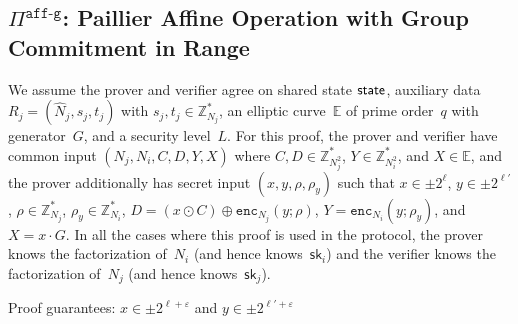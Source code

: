 \documentclass[11pt]{article}
\def\state{{\sf state}}
\newcommand{\enc}{\ensuremath{\mathtt{enc}}}
\newcommand{\proof}[1]{\ensuremath{\Pi^{\mathtt{#1}}}}
\newcommand{\sk}{\textsf{sk}}
\newcommand{\E}{\mathbb{E}}
\newcommand{\Z}{\mathbb{Z}}
\newcommand{\?}[1]{\stackrel{?}{#1}}
\begin{document}
\begin{description}
\end{description}

\subsection{\proof{aff\mbox{-}g}: Paillier Affine Operation with Group Commitment in Range}


We assume the prover and verifier agree on shared state $\state$, auxiliary data $R_j = (\hat N_j, s_j, t_j)$ with $s_j, t_j \in \Z^*_{N_j}$,
an elliptic curve~$\E$ of prime order~$q$ with generator~$G$,
and a security level~$L$.
For this proof, the prover and verifier have common input 
$(N_j, N_i, C, D, Y, X)$ 
where $C, D \in \Z^*_{N_j^2}$, 
$Y \in \Z^*_{N_i^2}$, and
$X \in \E$, and the prover additionally has secret input 
$(x, y, \rho, \rho_y)$ such that 
$x \in \pm 2^\ell$, 
$y \in \pm 2^{\ell'}$, 
$\rho \in \Z^*_{N_j}$, 
$\rho_y \in \Z^*_{N_i}$,  
$D = (x \odot C) \oplus \enc_{N_j}(y; \rho)$, 
$Y = \enc_{N_i}(y; \rho_y)$,
and $X = x \cdot G$.
In all the cases where this proof is used in the protocol, the prover knows the factorization of~$N_i$ (and hence knows~$\sk_i$) and the verifier knows the factorization of~$N_j$ (and hence knows~$\sk_j$).

Proof guarantees: $x \in \pm 2^{\ell + \varepsilon}$ and $y \in \pm 2^{\ell' + \varepsilon}$
\end{document}
